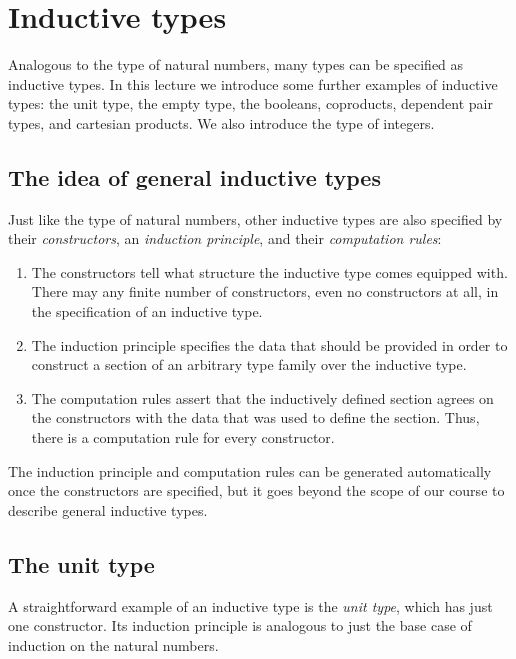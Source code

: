 \chapter{Inductive types}

Analogous to the type of natural numbers, many types can be specified as inductive types. In this lecture we introduce some further examples of inductive types: the unit type, the empty type, the booleans, coproducts, dependent pair types, and cartesian products. We also introduce the type of integers.

\section{The idea of general inductive types}

Just like the type of natural numbers, other inductive types are also specified by their \emph{constructors}, an \emph{induction principle}, and their \emph{computation rules}: 
\begin{enumerate}
\item The constructors tell what structure the inductive type comes equipped with. There may any finite number of constructors, even no constructors at all, in the specification of an inductive type. 
\item The induction principle specifies the data that should be provided in order to construct a section of an arbitrary type family over the inductive type. 
\item The computation rules assert that the inductively defined section agrees on the constructors with the data that was used to define the section. Thus, there is a computation rule for every constructor.
\end{enumerate}
The induction principle and computation rules can be generated automatically once the constructors are specified, but it goes beyond the scope of our course to describe general inductive types.


\section{The unit type}
A straightforward example of an inductive type is the \emph{unit type}, which has just one constructor. 
Its induction principle is analogous to just the base case of induction on the natural numbers.

